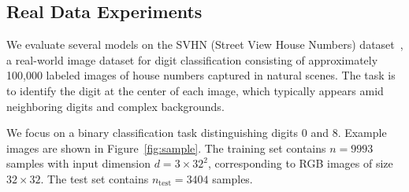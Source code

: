 \documentclass[sn-mathphys-num]{sn-jnl}%
\numberwithin{equation}{section}
\newcommand{\E}{\mathbb{E}}
\renewcommand{\H}{\mathcal{H}}
\newcommand{\norm}[1]{\left\|{#1}\right\|} %
\newcommand{\opnorm}[1]{\norm{#1}_{\rm op}} %
\newcommand{\normal}{\mathsf{N}}  %
\renewcommand{\H}{\mathbb{H}}
\renewcommand{\H}{\mathcal{H}}
\newcommand{\grad}{\nabla}
\newcommand{\half}{\frac{1}{2}}
\theoremstyle{thmstyleone}%
\theoremstyle{thmstyletwo}%
\theoremstyle{thmstylethree}%
\begin{document}




\subsection{Real Data Experiments}
\indent\indent
We evaluate several models on the SVHN (Street View House Numbers) dataset~\cite{NetzerWaCoBiWuNg11}, a real-world image dataset for digit classification consisting of approximately 100,000 labeled images of house numbers captured in natural scenes. The task is to identify the digit at the center of each image, which typically appears amid neighboring digits and complex backgrounds.

We focus on a binary classification task distinguishing digits $0$ and $8$. Example images are shown in Figure~\ref{fig:sample}. The training set contains $n = 9993$ samples with input dimension $d = 3 \times 32^2$, corresponding to RGB images of size $32 \times 32$. The test set contains $n_{\mathrm{test}} = 3404$ samples.
\end{document}
